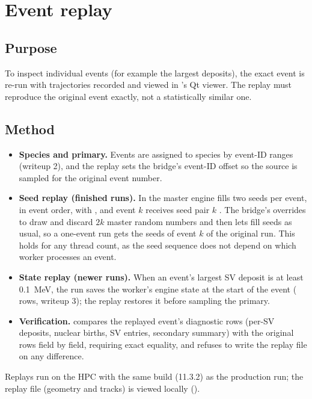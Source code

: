 
\section{Event replay}

\subsection{Purpose}
To inspect individual events (for example the largest deposits), the exact \gfour{} event is re-run with trajectories recorded and viewed in \gfour{}'s Qt viewer. The replay must reproduce the original event exactly, not a statistically similar one.

\subsection{Method}
\begin{itemize}
  \item \textbf{Species and primary.} Events are assigned to species by event-ID ranges (writeup 2), and the replay sets the bridge's event-ID offset so the source is sampled for the original event number.
  \item \textbf{Seed replay (finished runs).} In  the master engine fills two seeds per event, in event order, with , and event $k$ receives seed pair $k$ \citep{g4source}. The bridge's  overrides  to draw and discard $2k$ master random numbers and then lets \gfour{} fill seeds as usual, so a one-event run gets the seeds of event $k$ of the original run. This holds for any thread count, as the seed sequence does not depend on which worker processes an event.
  \item \textbf{State replay (newer runs).} When an event's largest SV deposit is at least \SI{0.1}{MeV}, the run saves the worker's engine state at the start of the event ( rows, writeup 3); the replay restores it before sampling the primary.
  \item \textbf{Verification.}  compares the replayed event's diagnostic rows (per-SV deposits, nuclear births, SV entries, secondary summary) with the original rows field by field, requiring exact equality, and refuses to write the replay file on any difference.
\end{itemize}
Replays run on the HPC with the same \gfour{} build (11.3.2) as the production run; the replay file (geometry and tracks) is viewed locally ().

